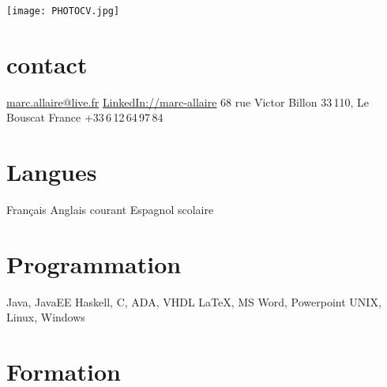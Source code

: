 \documentclass[]{friggeri-cv} %
\begin{document}


\begin{aside} %
\texttt{[image: PHOTOCV.jpg]}
\section{contact}
\href{mailto:marc.allaire@live.fr}{marc.allaire@live.fr}
\href{http://www.linkedin.com/pub/marc-allaire/62/79/936}{LinkedIn://marc-allaire}
68 rue Victor Billon
33\,110, Le Bouscat
France
+33\,6\,12\,64\,97\,84
\section{Langues}
Français
Anglais courant
Espagnol scolaire
\section{Programmation}
Java, JavaEE
Haskell, 
C, ADA, VHDL
\LaTeX, MS Word, Powerpoint
UNIX, Linux, Windows
\end{aside}


\section{Formation}
\end{document}

